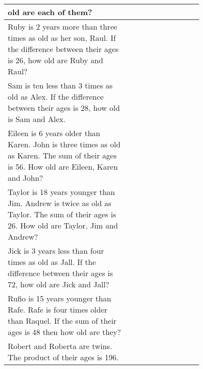 \begin{center}
\begin{longtable}{p{0.5\linewidth}>{\centering\arraybackslash$}p{0.3\linewidth}<{$}}
old are each of them? & \\ \hline
Ruby is 2 years more than three times as old as her son, Raul. If the difference between their ages is 26, how old are Ruby and Raul? & \\ \hline
Sam is ten less than 3 times as old as Alex. If the difference between their ages is 28, how old is Sam and Alex. & \\ \hline
Eileen is 6 years older than Karen. John is three times as old as Karen. The sum of their ages is 56. How old are Eileen, Karen and John? & \\ \hline
Taylor is 18 years younger than Jim. Andrew is twice as old as Taylor. The sum of their ages is 26. How old are Taylor, Jim and Andrew? & \\ \hline
Jick is 3 years less than four times as old as Jall. If the difference between their ages is 72, how old are Jick and Jall? & \\ \hline
Rufio is 15 years younger than Rafe. Rafe is four times older than Raquel. If the sum of their ages is 48 then how old are they? & \\ \hline
Robert and Roberta are twins. The product of their ages is 196. & \\ \hline
\hline
\end{longtable}
\end{center}
